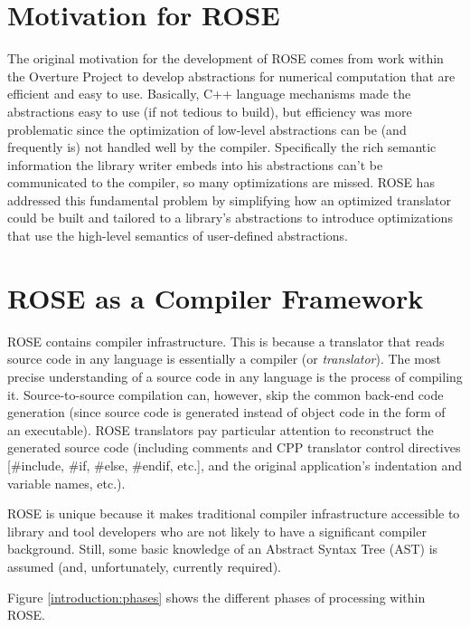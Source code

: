 \section{Motivation for ROSE}

   The original motivation for the development of ROSE comes from work within the Overture Project
to develop abstractions for numerical computation that are efficient and easy to use.
Basically, C++ language mechanisms made the abstractions easy to use (if not tedious to
build), but efficiency was more problematic since the optimization of low-level
abstractions can be (and frequently is) not handled well by the compiler.  Specifically
the rich semantic information the library writer embeds into his abstractions can't
be communicated to the compiler, so many optimizations are missed.  ROSE has addressed
this fundamental problem by simplifying how an optimized translator could be built and
tailored to a library's abstractions to introduce optimizations that use the high-level 
semantics of user-defined abstractions.

\section{ROSE as a Compiler Framework}

    ROSE contains compiler infrastructure. This is because a translator that reads
source code in any language is essentially a compiler (or {\em translator}).  The most precise understanding
of a source code in any language is the process of compiling it.  Source-to-source
compilation can, however, skip the common back-end code generation (since source code is
generated instead of object code in the form of an executable).  ROSE translators
pay particular attention to reconstruct the generated source code (including comments and
CPP translator control directives [\#include, \#if, \#else, \#endif, etc.], and 
the original application's indentation and variable names, etc.).

    ROSE is unique because 
it makes traditional compiler infrastructure
accessible to library and tool developers who are not likely to have a significant compiler
background.  Still, some basic knowledge of an Abstract Syntax Tree (AST) is 
assumed (and, unfortunately, currently required).  

   Figure \ref{introduction:phases} shows the different phases of processing within ROSE.

